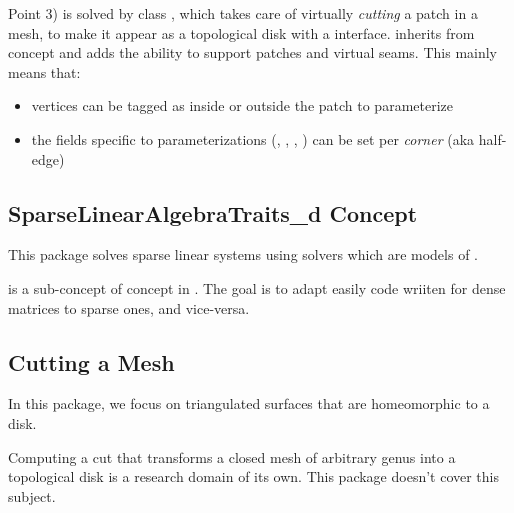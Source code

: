 Point 3) is solved by class , which takes care
of virtually {\em cutting}
a patch in a  mesh, to make it appear as a topological disk
with a  interface.
 inherits from concept  and adds
the ability to support patches and virtual seams.
This mainly means that:
\begin{itemize}
\item vertices can be tagged as inside or outside the patch to parameterize
\item the fields specific to parameterizations (, , , )
      can be set per {\em corner} (aka half-edge)
\end{itemize}


\subsection{SparseLinearAlgebraTraits\_d Concept}

This package solves sparse linear systems using solvers which are models
of .

 is a sub-concept of  concept
in .
The goal is to adapt easily code wriiten for dense matrices to sparse ones,
and vice-versa.


\subsection{Cutting a Mesh}

In this package, we focus on triangulated surfaces that are homeomorphic to a
disk.

Computing a cut that transforms
a closed mesh of arbitrary genus into a topological disk is a research domain
of its own. This package doesn't cover this subject.



